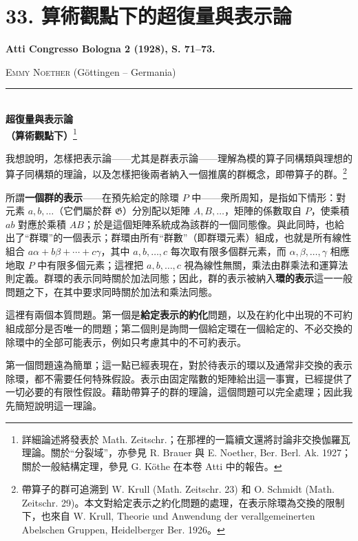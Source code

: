 \documentclass[11pt]{article}
\newcommand{\srcemph}[1]{\textbf{#1}}
\newcommand{\srctextsc}[1]{\textbf{#1}}
\begin{document}
\setcounter{footnote}{0}
\section*{33. 算術觀點下的超復量與表示論}
\srcemph{Atti Congresso Bologna 2 (1928), S. 71--73.}

\begingroup
\renewcommand{\thefootnote}{(\arabic{footnote})}

\begin{center}
\textsc{Emmy Noether} (Göttingen -- Germania)\\[-0.1em]
\rule{3em}{0.4pt}\\[0.8em]
\srctextsc{超復量與表示論}\\
\srctextsc{（算術觀點下）}\footnote{詳細論述將發表於 Math. Zeitschr.；在那裡的一篇續文還將討論非交換伽羅瓦理論。關於“分裂域”，亦參見 R. Brauer 與 E. Noether, Ber. Berl. Ak. 1927；關於一般結構定理，參見 G. Köthe 在本卷 Atti 中的報告。}
\end{center}

我想說明，怎樣把表示論——尤其是群表示論——理解為模的算子同構類與理想的算子同構類的理論，以及怎樣把後兩者納入一個推廣的群概念，即帶算子的群。\footnote{帶算子的群可追溯到 W. Krull (Math. Zeitschr. 23) 和 O. Schmidt (Math. Zeitschr. 29)。本文對給定表示之約化問題的處理，在表示除環為交換的限制下，也來自 W. Krull, Theorie und Anwendung der verallgemeinerten Abelschen Gruppen, Heidelberger Ber. 1926。}

所謂\srcemph{一個群的表示}——在預先給定的除環 $P$ 中——衆所周知，是指如下情形：對元素 $a,b,\ldots$（它們屬於群 $\mathfrak{G}$）分別配以矩陣 $A,B,\ldots$，矩陣的係數取自 $P$，使乘積 $ab$ 對應於乘積 $AB$；於是這個矩陣系統成為該群的一個同態像。與此同時，也給出了“群環”的一個表示；群環由所有“群數”（即群環元素）組成，也就是所有線性組合 $a\alpha+b\beta+\cdots+c\gamma$，其中 $a,b,\ldots,c$ 每次取有限多個群元素，而 $\alpha,\beta,\ldots,\gamma$ 相應地取 $P$ 中有限多個元素；這裡把 $a,b,\ldots,c$ 視為線性無關，乘法由群乘法和運算法則定義。群環的表示同時關於加法同態；因此，群的表示被納入\srcemph{環的表示}這一一般問題之下，在其中要求同時關於加法和乘法同態。

這裡有兩個本質問題。第一個是\srcemph{給定表示的約化}問題，以及在約化中出現的不可約組成部分是否唯一的問題；第二個則是詢問一個給定環在一個給定的、不必交換的除環中的全部可能表示，例如只考慮其中的不可約表示。

第一個問題遠為簡單；這一點已經表現在，對於待表示的環以及通常非交換的表示除環，都不需要任何特殊假設。表示由固定階數的矩陣給出這一事實，已經提供了一切必要的有限性假設。藉助帶算子的群的理論，這個問題可以完全處理；因此我先簡短說明這一理論。
\end{document}
